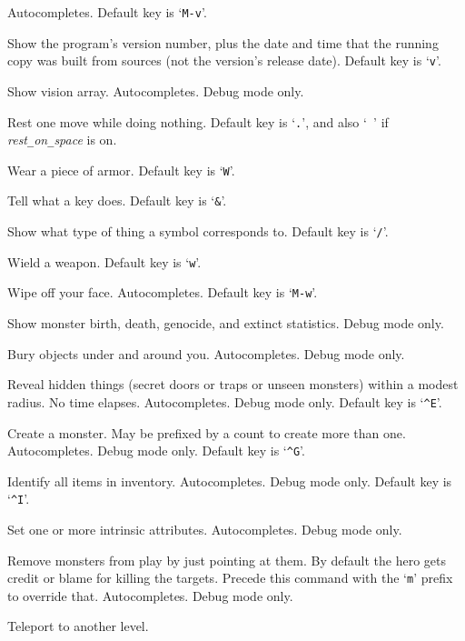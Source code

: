 Autocompletes. Default key is `{\tt M-v}'.
\item[\tb{\#versionshort}]
Show the program's version number, plus the date and time that the
running copy was built from sources (not the version's release date).
Default key is `{\tt v}'.
\item[\tb{\#vision}]
Show vision array.
Autocompletes.
Debug mode only.
\item[\tb{\#wait}]
Rest one move while doing nothing.
Default key is `{\tt .}', and also `{\tt{ }}' if
{\it rest\verb+_+on\verb+_+space\/} is on.
\item[\tb{\#wear}]
Wear a piece of armor. Default key is `{\tt W}'.
\item[\tb{\#whatdoes}]
Tell what a key does. Default key is `{\tt \&}'.
\item[\tb{\#whatis}]
Show what type of thing a symbol corresponds to. Default key is `{\tt /}'.
\item[\tb{\#wield}]
Wield a weapon. Default key is `{\tt w}'.
\item[\tb{\#wipe}]
Wipe off your face. Autocompletes. Default key is `{\tt M-w}'.
\item[\tb{\#wizborn}]
Show monster birth, death, genocide, and extinct statistics.
Debug mode only.
\item[\tb{\#wizbury}]
Bury objects under and around you.
Autocompletes.
Debug mode only.
\item[\tb{\#wizdetect}]
Reveal hidden things (secret doors or traps or unseen monsters)
within a modest radius.
No time elapses.
Autocompletes.
Debug mode only.
Default key is `{\tt \^{}E}'.
\item[\tb{\#wizgenesis}]
Create a monster.
May be prefixed by a count to create more than one.
Autocompletes.
Debug mode only.
Default key is `{\tt \^{}G}'.
\item[\tb{\#wizidentify}]
Identify all items in inventory.
Autocompletes.
Debug mode only.
Default key is `{\tt \^{}I}'.
\item[\tb{\#wizintrinsic}]
Set one or more intrinsic attributes.
Autocompletes.
Debug mode only.
\item[\tb{\#wizkill}]
Remove monsters from play by just pointing at them.
By default the hero gets credit or blame for killing the targets.
Precede this command with the `{\tt m}' prefix to override that.
Autocompletes.
Debug mode only.
\item[\tb{\#wizlevelport}]
Teleport to another level.
